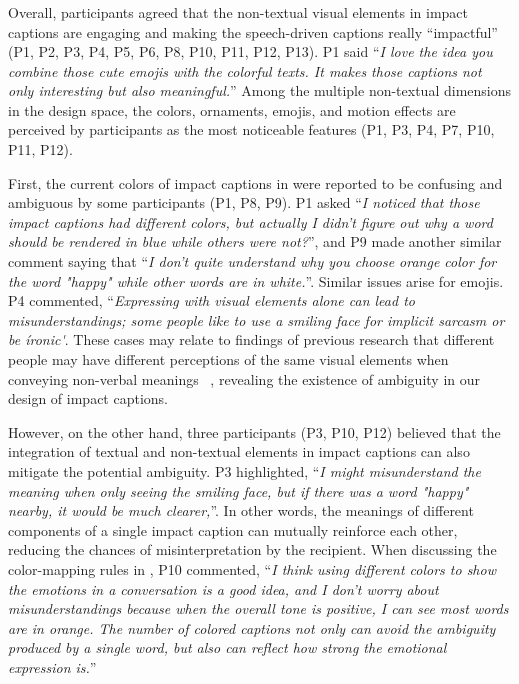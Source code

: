 \subsubsection{}
\label{finding_ambiguity}
Overall, participants agreed that the non-textual visual elements in impact captions are engaging and making the speech-driven captions really ``impactful'' (P1, P2, P3, P4, P5, P6, P8, P10, P11, P12, P13). 
P1 said ``\textit{I love the idea you combine those cute emojis with the colorful texts. It makes those captions not only interesting but also meaningful.}'' 
Among the multiple non-textual dimensions in the design space, the colors, ornaments, emojis, and motion effects are perceived by participants as the most noticeable features (P1, P3, P4, P7, P10, P11, P12). 

First, the current colors of impact captions in \system{} were reported to be confusing and ambiguous by some participants (P1, P8, P9). P1 asked ``\textit{I noticed that those impact captions had different colors, but actually I didn't figure out why a word should be rendered in blue while others were not?}'', and P9 made another similar comment saying that ``\textit{I don't quite understand why you choose orange color for the word "happy" while other words are in white.}''. 
Similar issues arise for emojis. P4 commented, ``\textit{Expressing with visual elements alone can lead to misunderstandings; some people like to use a smiling face for implicit sarcasm or be \'ironic\'}.
These cases may relate to findings of previous research that different people may have different perceptions of the same visual elements when conveying non-verbal meanings ~\cite{hanada2018correspondence, wilms2018color, czkestochowska2022context, miller2017understanding}, revealing the existence of ambiguity in our design of impact captions.

However, on the other hand, three participants (P3, P10, P12) believed that the integration of textual and non-textual elements in impact captions can also mitigate the potential ambiguity. P3 highlighted, ``\textit{I might misunderstand the meaning when only seeing the smiling face, but if there was a word "happy" nearby, it would be much clearer,}''. In other words, the meanings of different components of a single impact caption can mutually reinforce each other, reducing the chances of misinterpretation by the recipient. 
When discussing the color-mapping rules in \system{}, P10 commented, ``\textit{I think using different colors to show the emotions in a conversation is a good idea, and I don't worry about misunderstandings because when the overall tone is positive, I can see most words are in orange. The number of colored captions not only can avoid the ambiguity produced by a single word, but also can reflect how strong the emotional expression is.}''

